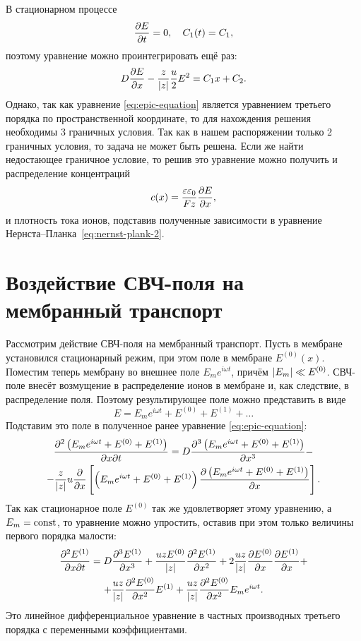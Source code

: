     В стационарном процессе
    \[
        \frac{\partial E}{\partial t} = 0,\quad C_1(t) = C_1,
    \]
    поэтому уравнение можно проинтегрировать ещё раз:
    \[
        D\frac{\partial E}{\partial x} - \frac{z}{\left| z \right|}\frac{u}{2}E^2 = C_1 x + C_2.
    \]
    Однако, так как уравнение \eqref{eq:epic-equation} является уравнением
    третьего порядка по пространственной координате, то для нахождения решения
    необходимы 3 граничных условия. Так как в нашем распоряжении только 2
    граничных условия, то задача не может быть решена. Если же найти
    недостающее граничное условие, то решив это уравнение можно получить и
    распределение концентраций
    \[
        c(x) = \frac{\varepsilon\varepsilon_0}{Fz}\frac{\partial E}{\partial x},
    \]
    и плотность тока ионов, подставив полученные зависимости в уравнение
    Нернста--Планка~\eqref{eq:nernst-plank-2}.

\section{Воздействие СВЧ-поля на мембранный транспорт}
    Рассмотрим действие СВЧ-поля на мембранный транспорт. Пусть в мембране
    установился стационарный режим, при этом поле в мембране \( E^{(0)}(x) \).
    Поместим теперь мембрану во внешнее поле \( E_m e^{i\omega t} \), причём
    \( \left| E_m \right| \ll E^{(0)} \). СВЧ-поле внесёт возмущение в распределение
    ионов в мембране и, как следствие, в распределение поля. Поэтому
    результирующее поле можно представить в виде
    \begin{equation}
        E = E_m e^{i\omega t} + E^{(0)} + E^{(1)} + \ldots
    \end{equation}
    Подставим это поле в полученное ранее уравнение \eqref{eq:epic-equation}:
    \begin{gather*}
        \frac{\partial^2 \left(E_m e^{i\omega t} + E^{(0)} + E^{(1)}\right)}{\partial x \partial t} =
         D\frac{\partial^3
             \left(E_m e^{i\omega t} + E^{(0)} + E^{(1)}\right)
        }{\partial x^3}
         -\\-
        \frac{z}{\left| z \right|}u\frac{\partial }{\partial x}\left[
        \left(E_m e^{i\omega t} + E^{(0)} + E^{(1)}\right)
        \frac{\partial \left(E_m e^{i\omega t} + E^{(0)} + E^{(1)}\right)}{\partial x}\right].
    \end{gather*}
    Так как стационарное поле \( E^{(0)} \) так же удовлетворяет этому
    уравнению, а \( E_m = \mathrm{const} \), то уравнение можно упростить, оставив при
    этом только величины первого порядка малости:
    \begin{gather*}
        \frac{\partial^2 E^{(1)}}{\partial x \partial t} = D\frac{\partial^3 E^{(1)}}{\partial x^3} +
        \frac{uzE^{(0)}}{\left| z \right|}\frac{\partial^2 E^{(1)}}{\partial {x}^2} +
        2\frac{uz}{\left| z \right|}\frac{\partial E^{(0)}}{\partial x}\frac{\partial E^{(1)}}{\partial x} + \\ +
        \frac{uz}{\left| z \right|}\frac{\partial^2 E^{(0)}}{\partial {x}^2} E^{(1)} +
        \frac{uz}{\left| z \right|}\frac{\partial^2 E^{(0)}}{\partial {x}^2} E_m e^{i\omega t}.
    \end{gather*}
    Это линейное дифференциальное уравнение в частных производных третьего
    порядка с переменными коэффициентами.

